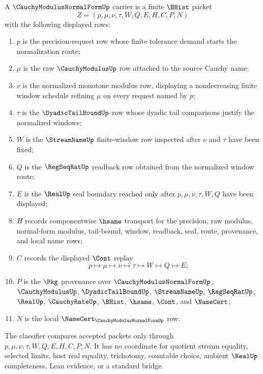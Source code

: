 \begin{definition}
\label{def:cauchy-modulus-normal-form-carrier}
A $\CauchyModulusNormalFormUp$ carrier is a finite $\BHist$ packet
$$
Z=(p,\mu,\nu,\tau,W,Q,E,H,C,P,N)
$$
with the following displayed rows:
\begin{enumerate}
\item $p$ is the precision-request row whose finite tolerance demand starts the normalization route;
\item $\mu$ is the raw $\CauchyModulusUp$ row attached to the source Cauchy name;
\item $\nu$ is the normalized monotone modulus row, displaying a nondecreasing finite window schedule refining $\mu$ on every request named by $p$;
\item $\tau$ is the $\DyadicTailBoundUp$ row whose dyadic tail comparisons justify the normalized windows;
\item $W$ is the $\StreamNameUp$ finite-window row inspected after $\nu$ and $\tau$ have been fixed;
\item $Q$ is the $\RegSeqRatUp$ readback row obtained from the normalized window route;
\item $E$ is the $\RealUp$ seal boundary reached only after $p,\mu,\nu,\tau,W,Q$ have been displayed;
\item $H$ records componentwise $\hsame$ transport for the precision, raw modulus, normal-form modulus, tail-bound, window, readback, seal, route, provenance, and local name rows;
\item $C$ records the displayed $\Cont$ replay
$$
p\longmapsto \mu\longmapsto \nu\longmapsto \tau\longmapsto W\longmapsto Q\longmapsto E ;
$$
\item $P$ is the $\Pkg$ provenance over $\CauchyModulusNormalFormUp$, $\CauchyModulusUp$, $\DyadicTailBoundUp$, $\StreamNameUp$, $\RegSeqRatUp$, $\RealUp$, $\CauchyRateUp$, $\BHist$, $\hsame$, $\Cont$, and $\NameCert$;
\item $N$ is the local $\NameCert_{\CauchyModulusNormalFormUp}$ row.
\end{enumerate}
The classifier compares accepted packets only through $p,\mu,\nu,\tau,W,Q,E,H,C,P,N$. It has no coordinate for quotient stream equality, selected limits, host real equality, trichotomy, countable choice, ambient $\RealUp$ completeness, Lean evidence, or a standard bridge.
\end{definition}

